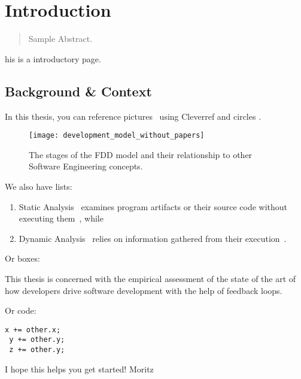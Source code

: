 \chapter{Introduction}
\label{introduction}

\begin{abstract}
Sample Abstract.
\end{abstract}



\newpage

his is a introductory page.

\section{Background \& Context}
In this thesis, you can reference pictures~ using Cleverref and circles .

\begin{figure}[htb]
	\centering
	\texttt{[image: development\_model\_without\_papers]}
	\caption{The stages of the FDD model and their relationship to other
          Software Engineering concepts.}
	\label{fig:devmodel}
\end{figure}

We also have lists:

\begin{enumerate}
  \item Static Analysis~ examines program artifacts or
    their source code without executing them~\cite{wichmann1995industrial}, while
 \item Dynamic Analysis~ relies on information gathered from their
   execution~\cite{cornelissen2009systematic}.
\end{enumerate}

Or boxes:

\begin{framed}
This thesis is concerned with the empirical assessment of the state of the art of how developers
drive software development with the help of feedback loops.
\end{framed}

Or code:
\begin{lstlisting}[caption={\textsc{TrinityCore}},label={lst:e1}]
 x += other.x;
 y += other.y;
 z += other.y;
\end{lstlisting}


I hope this helps you get started!
Moritz
